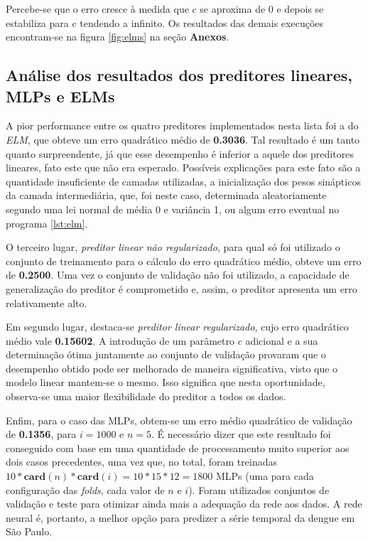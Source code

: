 	\FloatBarrier
	
Percebe-se que o erro cresce à medida que \(c\) se aproxima de 0 e depois se
estabiliza para c tendendo a infinito.  Os resultados das demais execuções
encontram-se na figura \ref{fig:elms} na seção \textbf{Anexos}.

\subsection{Análise dos resultados dos preditores lineares, MLPs e ELMs}
\label{sec:comparacao}

A pior performance entre os quatro preditores implementados nesta lista foi a
do \textit{ELM}, que obteve um erro quadrático médio de \textbf{0.3036}. Tal
resultado é um tanto quanto surpreendente, já que esse desempenho é inferior a
aquele dos preditores lineares, fato este que não era esperado.  Possíveis
explicações para este fato são a quantidade insuficiente de camadas utilizadas,
a inicialização dos pesos sinápticos da camada intermediária, que, foi neste
caso, determinada aleatoriamente segundo uma lei normal de média 0 e variância
1, ou algum erro eventual no programa \ref{lst:elm}.

\vspace{12pt}

O terceiro lugar, \textit{preditor linear não regularizado}, para qual só foi
utilizado o conjunto de treinamento para o cálculo do erro quadrático médio,
obteve um erro de \textbf{0.2500}. Uma vez o conjunto de validação não foi
utilizado, a capacidade de generalização do preditor é comprometido e, assim, o
preditor apresenta um erro relativamente alto.

\vspace{12pt}

Em segundo lugar, destaca-se \textit{preditor linear regularizado}, cujo erro
quadrático médio vale \textbf{0.15602}. A introdução de um parâmetro \(c\) adicional e a
sua determinação ótima juntamente ao conjunto de validação provaram que o
desempenho obtido pode ser melhorado de maneira significativa, visto que o
modelo linear mantem-se o mesmo. Isso significa que nesta oportunidade,
observa-se uma maior flexibilidade do preditor a todos os dados.

\vspace{12pt}  

Enfim, para o caso das MLPs, obtem-se um erro médio quadrático de validação de
\textbf{0.1356}, para \(i=1000\) e \(n=5\). É necessário dizer que este resultado foi
conseguido com base em uma quantidade de processamento muito superior aos dois
casos precedentes, uma vez que, no total, foram treinadas
\(10*\mathbf{card}(n)*\mathbf{card}(i) = 10*15*12 = 1800\) MLPs (uma para cada
configuração das \textit{folds}, cada valor de \(n\) e \(i\)). Foram utilizados
conjuntos de validação e teste para otimizar ainda mais a adequação da rede aos
dados. A rede neural é, portanto, a melhor opção para predizer a série temporal
da dengue em São Paulo.